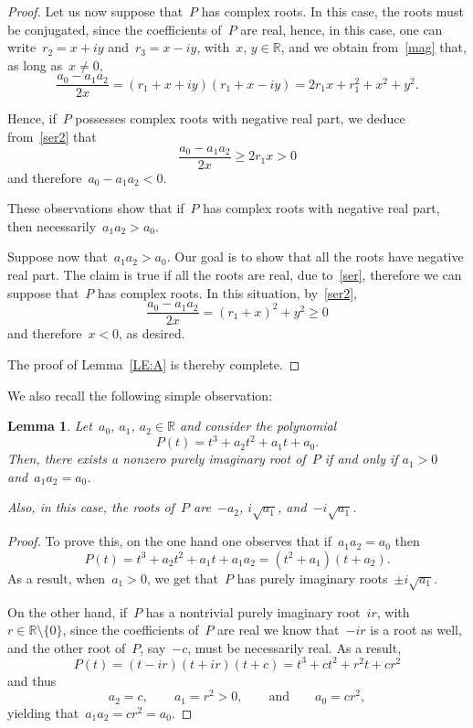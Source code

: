 \documentclass[12pt]{amsart}
\newcommand{\R}{\mathbb{R}}
\numberwithin{equation}{section}
\newtheorem{lemma}[theorem]{Lemma}
\renewcommand{\ge}{\geqslant}
\begin{document}
\begin{appendix}
\begin{proof}
Let us now suppose that~$P$ has complex roots.
In this case, the roots must be conjugated, since the coefficients of~$P$ are real,
hence, in this case, one can write~$r_2=x+iy$ and~$r_3=x-iy$, with~$x$, $y\in\R$,
and we obtain from~\eqref{mag} that, as long as~$x\ne0$,
\begin{equation}\label{ser2} \frac{a_0-a_1a_2}{2x}=(r_1 + x+iy) (r_1 + x-iy)=
2 r_1 x + r_1^2 + x^2 + y^2.\end{equation}

Hence, if~$P$ possesses complex roots with negative real part, we deduce from~\eqref{ser2} that
$$ \frac{a_0-a_1a_2}{2x}\ge 2 r_1 x>0$$
and therefore~$a_0-a_1a_2<0$.

These observations show that if~$P$ has complex
roots with negative real part, then necessarily~$a_1 a_2 > a_0 $.

Suppose now that~$a_1 a_2 > a_0 $. Our goal is to show that all the roots have negative
real part. The claim is true if all the roots are real, due to~\eqref{ser}, therefore
we can suppose that~$P$ has complex roots. In this situation, by~\eqref{ser2},
$$\frac{a_0-a_1a_2}{2x}=
(r_1 + x)^2 + y^2\ge0
$$and therefore~$x<0$, as desired.

The proof of Lemma~\ref{LE:A} is thereby complete.
\end{proof}

We also recall the following simple observation:

\begin{lemma}\label{LEMMA2}
Let~$a_0$, $a_1$, $a_2\in\R$ and consider the polynomial $$P(t) = t^3 + a_2 t^2 + a_1 t + a_0.$$ Then, there exists a nonzero
purely imaginary root of~$P$ if and only if $a_1>0$ and~$a_1 a_2 = a_0 $.

Also, in this case, the roots of~$P$ are~$-a_2$,  $i\sqrt{a_1}$, and~$-i\sqrt{a_1}$.
\end{lemma}

\begin{proof}
To prove this, on the one hand one observes that if~$a_1 a_2 = a_0 $ then
$$P(t) = t^3 + a_2 t^2 + a_1 t + a_1a_2=
(t^2+a_1)(t+a_2).$$
As a result, when~$a_1>0$, we get that~$P$ has purely imaginary roots~$\pm i\sqrt{a_1}$.

On the other hand, if~$P$ has a nontrivial purely imaginary root~$ir$, with~$r\in\R\setminus\{0\}$,
since the coefficients of~$P$ are real we know that~$-ir$ is a root as well,
and the other root of~$P$, say~$-c$, must be necessarily real.
As a result,
$$P(t)=(t-ir)(t+ir)(t+c)=
t^3 + c t^2 +r^2 t + c r^2 $$
and thus
$$ a_2=c,\qquad a_1=r^2>0,\qquad{\mbox{and}}\qquad a_0=cr^2,$$
yielding that~$a_1 a_2 = cr^2=a_0$.
\end{proof}


\end{appendix}
\end{document}
